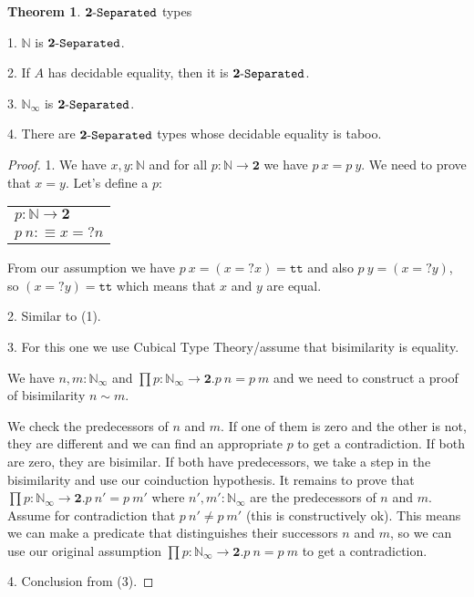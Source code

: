 \documentclass[11pt]{article}
\theoremstyle{definition}
\newtheorem{theorem}{Theorem}[section]
\newcommand{\txt}[1]{\texttt{#1}}
\renewcommand{\(}{\left(}
\renewcommand{\)}{\right)}
\newcommand{\defn}{:\equiv}
\newcommand{\apl}[2]{#1\ #2}
\newcommand{\Bool}{\mathbf{2}}
\newcommand{\true}{\txt{tt}}
\newcommand{\Nat}{\mathbb{N}}
\newcommand{\Conat}{\mathbb{N}_\infty}
\newcommand{\dprod}[2]{\prod #1.#2}
\begin{document}
\begin{theorem} $\Separated{\Bool}$ types

1. $\Nat$ is $\Separated{\Bool}$.

2. If $A$ has decidable equality, then it is $\Separated{\Bool}$.

3. $\Conat$ is $\Separated{\Bool}$.

4. There are $\Separated{\Bool}$ types whose decidable equality is taboo.

\end{theorem}
\begin{proof}
1. We have $x, y : \Nat$ and for all $p : \Nat \to \Bool$ we have $\apl{p}{x} = \apl{p}{y}$. We need to prove that $x = y$. Let's define a $p$:

\begin{center}
\begin{tabular}{l}
$p : \Nat \to \Bool$ \\
$\apl{p}{n} \defn x =? n$
\end{tabular}
\end{center}

From our assumption we have $\apl{p}{x} = (x =? x) = \true$ and also $\apl{p}{y} = (x =? y)$, so $(x =? y) = \true$ which means that $x$ and $y$ are equal.

2. Similar to (1).

3. For this one we use Cubical Type Theory/assume that bisimilarity is equality.

We have $n, m : \Conat$ and $\dprod{p : \Conat \to \Bool}{\apl{p}{n} = \apl{p}{m}}$ and we need to construct a proof of bisimilarity $n \sim m$.

We check the predecessors of $n$ and $m$. If one of them is zero and the other is not, they are different and we can find an appropriate $p$ to get a contradiction. If both are zero, they are bisimilar. If both have predecessors, we take a step in the bisimilarity and use our coinduction hypothesis. It remains to prove that $\dprod{p : \Conat \to \Bool}{\apl{p}{n'} = \apl{p}{m'}}$ where $n', m' : \Conat$ are the predecessors of $n$ and $m$. Assume for contradiction that $\apl{p}{n'} \neq \apl{p}{m'}$ (this is constructively ok). This means we can make a predicate that distinguishes their successors $n$ and $m$, so we can use our original assumption $\dprod{p : \Conat \to \Bool}{\apl{p}{n} = \apl{p}{m}}$ to get a contradiction.

4. Conclusion from (3).

\end{proof}
\end{document}
